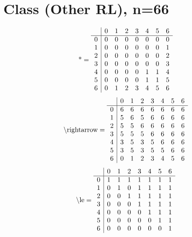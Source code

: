 \documentclass[11pt]{article}
\begin{document}
\section{Class (Other RL), n=66}
\[\text{*} = 
\begin{array}{r | r r r r r r r}
 & 0 & 1 & 2 & 3 & 4 & 5 & 6 \\ \hline
0 & 0 & 0 & 0 & 0 & 0 & 0 & 0 \\
1 & 0 & 0 & 0 & 0 & 0 & 0 & 1 \\
2 & 0 & 0 & 0 & 0 & 0 & 0 & 2 \\
3 & 0 & 0 & 0 & 0 & 0 & 0 & 3 \\
4 & 0 & 0 & 0 & 0 & 1 & 1 & 4 \\
5 & 0 & 0 & 0 & 0 & 1 & 1 & 5 \\
6 & 0 & 1 & 2 & 3 & 4 & 5 & 6 \\
\end{array}
\]
\[\text{\textbackslash rightarrow} = 
\begin{array}{r | r r r r r r r}
 & 0 & 1 & 2 & 3 & 4 & 5 & 6 \\ \hline
0 & 6 & 6 & 6 & 6 & 6 & 6 & 6 \\
1 & 5 & 6 & 5 & 6 & 6 & 6 & 6 \\
2 & 5 & 5 & 6 & 6 & 6 & 6 & 6 \\
3 & 5 & 5 & 5 & 6 & 6 & 6 & 6 \\
4 & 3 & 5 & 3 & 5 & 6 & 6 & 6 \\
5 & 3 & 5 & 3 & 5 & 5 & 6 & 6 \\
6 & 0 & 1 & 2 & 3 & 4 & 5 & 6 \\
\end{array}
\]
\[\text{\textbackslash le} = 
\begin{array}{r | r r r r r r r}
 & 0 & 1 & 2 & 3 & 4 & 5 & 6 \\ \hline
0 & 1 & 1 & 1 & 1 & 1 & 1 & 1 \\
1 & 0 & 1 & 0 & 1 & 1 & 1 & 1 \\
2 & 0 & 0 & 1 & 1 & 1 & 1 & 1 \\
3 & 0 & 0 & 0 & 1 & 1 & 1 & 1 \\
4 & 0 & 0 & 0 & 0 & 1 & 1 & 1 \\
5 & 0 & 0 & 0 & 0 & 0 & 1 & 1 \\
6 & 0 & 0 & 0 & 0 & 0 & 0 & 1 \\
\end{array}
\]
\end{document}
